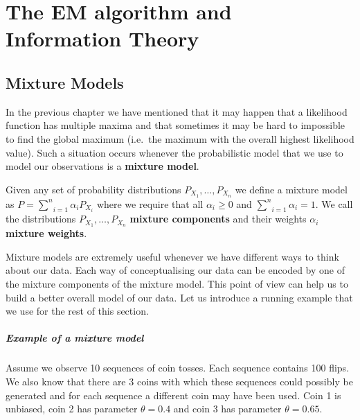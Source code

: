 \chapter{The EM algorithm and Information Theory}

\section{Mixture Models}\label{sec:mixtureModels}

In the previous chapter we have mentioned that it may happen that a likelihood function has multiple 
maxima and that sometimes it may be hard to impossible to find the global maximum (i.e.\ the maximum
with the overall highest likelihood value). Such a situation occurs whenever the probabilistic model
that we use to model our observations is a \textbf{mixture model}.

\begin{Definition}\label{def:mixtureModel}
Given any set of probability distributions $ P_{X_1}, \ldots, P_{X_n} $  we define a mixture model as
$ P = \underset{i=1}{\overset{n}{\sum}} \alpha_{i}P_{X_i} $
where we require that all $ \alpha_{i} \geq 0$ and 
$ \underset{i=1}{\overset{n}{\sum}} \alpha_{i} = 1 $.
We call the distributions $ P_{X_1}, \ldots, P_{X_n} $ \textbf{mixture components} and their weights
$ \alpha_{i} $ \textbf{mixture weights}.
\end{Definition}

Mixture models are extremely useful whenever we have different ways to think about our data. Each way
of conceptualising our data can be encoded by one of the mixture components of the mixture model.
This point of view can help us to build a better overall model of our data. Let us introduce a running example that
we use for the rest of this section. 

\paragraph{Example of a mixture model} Assume we observe 10 sequences of coin tosses. Each sequence
contains 100 flips. We also know that there are 3 coins with which these sequences could possibly be
generated and for each sequence a different coin may have been used. Coin 1 is unbiased, coin 2 has
parameter $ \theta = 0.4 $ and coin 3 has parameter $ \theta = 0.65 $. 
 
